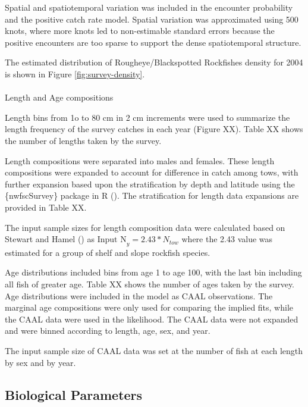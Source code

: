 \documentclass[
]{scrartcl}
\makeatletter
\let\oldparagraph\paragraph
\renewcommand{\paragraph}{
    \@ifstar
      \xxxParagraphStar
      \xxxParagraphNoStar
  }
\newcommand{\xxxParagraphStar}[1]{\oldparagraph*{#1}\mbox{}}
\newcommand{\xxxParagraphNoStar}[1]{\oldparagraph{#1}\mbox{}}
\makeatother
\begin{document}
Spatial and spatiotemporal variation was included in the encounter
probability and the positive catch rate model. Spatial variation was
approximated using 500 knots, where more knots led to non-estimable
standard errors because the positive encounters are too sparse to
support the dense spatiotemporal structure.

The estimated distribution of Rougheye/Blackspotted Rockfishes density
for 2004 is shown in Figure \ref{fig:survey-density}.

\paragraph{Length and Age
compositions}\label{length-and-age-compositions}

Length bins from 1o to 80 cm in 2 cm increments were used to summarize
the length frequency of the survey catches in each year (Figure XX).
Table XX shows the number of lengths taken by the survey.

Length compositions were separated into males and females. These length
compositions were expanded to account for difference in catch among
tows, with further expansion based upon the stratification by depth and
latitude using the \{nwfscSurvey\} package in R
().
The stratification for length data expansions are provided in Table XX.

The input sample sizes for length composition data were calculated based
on Stewart and Hamel ()
as \(\text{Input N}_{y} = 2.43*N_{tow}\) where the 2.43 value was
estimated for a group of shelf and slope rockfish species.

Age distributions included bins from age 1 to age 100, with the last bin
including all fish of greater age. Table XX shows the number of ages
taken by the survey. Age distributions were included in the model as
CAAL observations. The marginal age compositions were only used for
comparing the implied fits, while the CAAL data were used in the
likelihood. The CAAL data were not expanded and were binned according to
length, age, sex, and year.

The input sample size of CAAL data was set at the number of fish at each
length by sex and by year.

\subsection{Biological Parameters}\label{biological-parameters}
\end{document}
